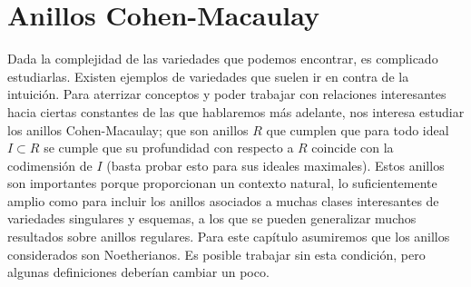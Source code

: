 \chapter{Anillos Cohen-Macaulay}

Dada la complejidad de las variedades que podemos encontrar, es complicado estudiarlas. Existen ejemplos de variedades que suelen ir en contra de la intuición. Para aterrizar conceptos y poder trabajar con relaciones interesantes hacia ciertas constantes de las que hablaremos más adelante, nos interesa estudiar los anillos Cohen-Macaulay; que son anillos $R$ que cumplen que para todo ideal $I \subset R$ se cumple que su profundidad con respecto a $R$ coincide con la codimensión de $I$ (basta probar esto para sus ideales maximales). Estos anillos son importantes porque proporcionan un contexto natural, lo suficientemente amplio como para incluir los anillos asociados a muchas clases interesantes de variedades singulares y esquemas, a los que se pueden generalizar muchos resultados sobre anillos regulares. Para este capítulo asumiremos que los anillos considerados son Noetherianos. Es posible trabajar sin esta condición, pero algunas definiciones deberían cambiar un poco.


